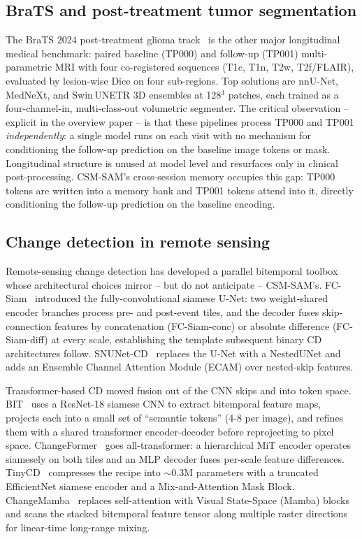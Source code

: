 \subsection{BraTS and post-treatment tumor segmentation}
\label{sec:related:brats}

The BraTS 2024 post-treatment glioma track~\cite{delarosa2024brats}
is the other major longitudinal medical benchmark: paired baseline
(TP000) and follow-up (TP001) multi-parametric MRI with four
co-registered sequences (T1c, T1n, T2w, T2f/FLAIR), evaluated by
lesion-wise Dice on four sub-regions. Top solutions are nnU-Net,
MedNeXt, and Swin\,UNETR 3D ensembles at 128$^3$ patches, each
trained as a four-channel-in, multi-class-out volumetric segmenter.
The critical observation -- explicit in the overview paper -- is that
these pipelines process TP000 and TP001 \emph{independently}: a
single model runs on each visit with no mechanism for conditioning
the follow-up prediction on the baseline image tokens or mask.
Longitudinal structure is unused at model level and resurfaces only
in clinical post-processing. CSM-SAM's cross-session memory occupies
this gap: TP000 tokens are written into a memory bank and TP001
tokens attend into it, directly conditioning the follow-up prediction
on the baseline encoding.

\subsection{Change detection in remote sensing}
\label{sec:related:cd}

Remote-sensing change detection has developed a parallel bitemporal
toolbox whose architectural choices mirror -- but do not anticipate
-- CSM-SAM's. FC-Siam~\cite{daudt2018fcsiam} introduced the
fully-convolutional siamese U-Net: two weight-shared encoder branches
process pre- and post-event tiles, and the decoder fuses
skip-connection features by concatenation (FC-Siam-conc) or absolute
difference (FC-Siam-diff) at every scale, establishing the template
subsequent binary CD architectures follow. SNUNet-CD~\cite{fang2022snunet}
replaces the U-Net with a NestedUNet and adds an Ensemble Channel
Attention Module (ECAM) over nested-skip features.

Transformer-based CD moved fusion out of the CNN skips and into
token space. BIT~\cite{chen2021bit} uses a ResNet-18 siamese CNN to
extract bitemporal feature maps, projects each into a small set of
``semantic tokens'' (4-8 per image), and refines them with a shared
transformer encoder-decoder before reprojecting to pixel space.
ChangeFormer~\cite{bandara2022changeformer} goes all-transformer: a
hierarchical MiT encoder operates siamesely on both tiles and an MLP
decoder fuses per-scale feature differences.
TinyCD~\cite{codegoni2023tinycd} compresses the recipe into
$\sim$0.3M parameters with a truncated EfficientNet siamese encoder
and a Mix-and-Attention Mask Block.
ChangeMamba~\cite{chen2024changemamba} replaces self-attention with
Visual State-Space (Mamba) blocks and scans the stacked bitemporal
feature tensor along multiple raster directions for linear-time
long-range mixing.


